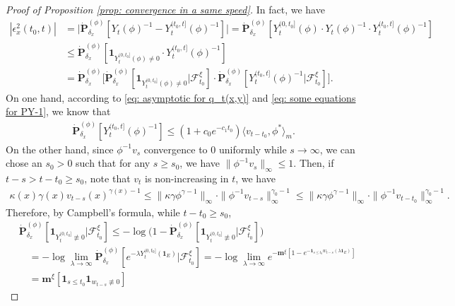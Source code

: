 \documentclass[12pt, a4paper]{amsart}
\theoremstyle{definition}
\numberwithin{equation}{section}
\begin{document}
\begin{proof}[Proof of Proposition \ref{prop: convergence in a same speed}]
	In fact, we have
\[\label{eq:epsilon-2}\begin{split}
	|\epsilon_x^2(t_0,t)|
	&= \big| \dot{\mathbf P}_{\delta_x}^{(\phi)}[Y_t(\phi)^{-1} - Y^{(t_0,t]}_t(\phi)^{-1}] \big| 
	= \dot{\mathbf P}_{\delta_x}^{(\phi)}[Y_t^{(0,t_0]}(\phi)\cdot Y_t(\phi)^{-1}\cdot Y^{(t_0,t]}_t(\phi)^{-1}]
	\\&\leq \dot{\mathbf P}_{\delta_x}^{(\phi)}[\mathbf 1_{Y_t^{(0,t_0]}(\phi)\neq 0}\cdot Y^{(t_0,t]}_t(\phi)^{-1}]
	\\&= \dot{\mathbf P}_{\delta_x}^{(\phi)} \big[\dot{\mathbf P}_{\delta_x}^{(\phi)}[\mathbf 1_{Y_t^{(0,t_0]}(\phi)\neq 0}|\mathscr F^\xi_{t_0}] \cdot \dot{\mathbf P}_{\delta_x}^{(\phi)} [ Y^{(t_0,t]}_t(\phi)^{-1}|\mathscr F^\xi_{t_0}] \big].
\end{split}\]
	On one hand, according to \eqref{eq: asymptotic for q_t(x,y)} and \eqref{eq: some equations for PY-1}, we know that
\[\label{eq:epsilon-2-final}\begin{split}
	\dot{\mathbf P}_{\delta_x}^{(\phi)}[ Y^{(t_0,t]}_t(\phi)^{-1}]
	\leq (1+c_0 e^{-c_1 t_0}) \langle v_{t-t_0},\phi^* \rangle_m.
\end{split}\]
	On the other hand, since $\phi^{-1}v_s$ convergence to $0$ uniformly while $s\to \infty$, we can chose an $s_0>0$ such that for any $s\geq s_0$, we have $\|\phi^{-1}v_s\|_{\infty} \leq 1$.
	Then, if $t-s > t-t_0 \geq s_0$, note that $v_t$ is non-increasing in $t$, we have
\[\begin{split}
	\kappa(x)\gamma(x) v_{t-s}(x)^{\gamma(x)-1}
	\leq \|\kappa \gamma \phi^{\gamma - 1}\|_\infty \cdot \|\phi^{-1} v_{t-s}\|^{\gamma_0-1}_\infty
	\leq \|\kappa\gamma\phi^{\gamma - 1}\|_\infty \cdot \|\phi^{-1}v_{t-t_0}\|^{\gamma_0-1}_\infty.
\end{split}\]
	Therefore, by Campbell's formula, while $t-t_0 \geq s_0$,
\[\label{eq:firstpart-of-Y}\begin{split}
	&\dot{\mathbf P}_{\delta_x}^{(\phi)}[\mathbf 1_{Y_t^{(0,t_0]}\not \equiv  0}|\mathscr F^\xi_{t_0}]
	\leq - \log \big( 1- \dot{\mathbf P}_{\delta_x}^{(\phi)}[\mathbf 1_{Y_t^{(0,t_0]}\not \equiv  0}|\mathscr F^\xi_{t_0}]\big)
	\\&\quad =  - \log \lim_{\lambda \to \infty}\dot{\mathbf P}_{\delta_x}^{(\phi)}[e^{- \lambda Y_t^{(0,t_0]}(\mathbf 1_E) }|\mathscr F^\xi_{t_0}]
	= -\log \lim_{\lambda \to \infty}e^{- \mathbf m^\xi [ 1-e^{- \mathbf 1_{s\leq t_0} w_{t-s}(\lambda \mathbf 1_E)}  ]}
	\\&\quad = \mathbf m^\xi [\mathbf 1_{s\leq t_0} \mathbf 1_{w_{t-s} \not \equiv 0}]

\end{split}\]
\end{proof}
\end{document}

